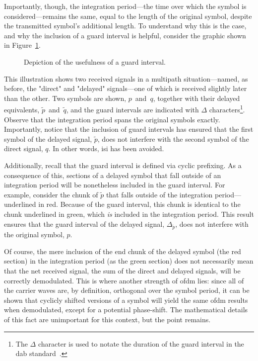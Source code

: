 \documentclass[class=report,11pt,crop=false]{standalone}
\begin{document}
Importantly, though, the integration period---the time over which the symbol is considered---remains the same, equal to the length of the original symbol, despite the transmitted symbol's additional length. To understand why this is the case, and why the inclusion of a guard interval is helpful, consider the graphic shown in Figure~\ref{fig:guard-intervals-demo-2}.

\begin{figure}[htbp]
    \centering
    \captionsetup{type=figure}
    \def\svgwidth{\linewidth}
    { %
        }
    \caption{Depiction of the usefulness of a guard interval.}
    \label{fig:guard-intervals-demo-2}
\end{figure}

This illustration shows two received signals in a multipath situation---named, as before, the "direct" and "delayed" signals---one of which is received slightly later than the other. Two symbols are shown, \(p\)~and~\(q\), together with their delayed equivalents, \(\tilde{p}\)~and~\(\tilde{q}\), and the guard intervals are indicated with \(\Delta\) characters\footnote{The \(\Delta\) character is used to notate the duration of the guard interval in the \gls{dab} standard~\cite{dabstandard}.}. Observe that the integration period spans the original symbols exactly. Importantly, notice that the inclusion of guard intervals has ensured that the first symbol of the delayed signal, \(\tilde{p}\), does not interfere with the second symbol of the direct signal, \(q\). In other words, \gls{isi} has been avoided.

Additionally, recall that the guard interval is defined via cyclic prefixing. As a consequence of this, sections of a delayed symbol that fall outside of an integration period will be nonetheless included in the guard interval. For example, consider the chunk of \(\tilde{p}\) that falls outside of the integration period---underlined in red. Because of the guard interval, this chunk is identical to the chunk underlined in green, which \emph{is} included in the integration period. This result ensures that the guard interval of the delayed signal, \(\Delta_{\tilde{p}}\), does not interfere with the original symbol, \(p\).

Of course, the mere inclusion of the end chunk of the delayed symbol (the red section) in the integration period (as the green section) does not necessarily mean that the net received signal, the sum of the direct and delayed signals, will be correctly demodulated. This is where another strength of \gls{ofdm} lies: since all of the carrier waves are, by definition, orthogonal over the symbol period, it can be shown that cyclicly shifted versions of a symbol will yield the same \gls{ofdm} results when demodulated, except for a potential phase-shift. The mathematical details of this fact are unimportant for this context, but the point remains.
\end{document}
